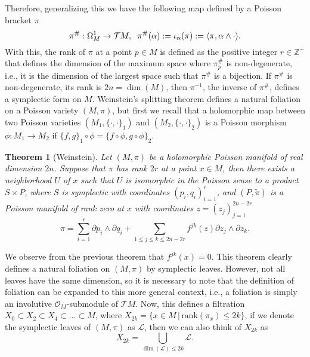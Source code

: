 \documentclass[12pt,twoside,a4paper]{report}
\newtheorem{theorem}{Theorem}[section]
\newcommand{\zah}{\ensuremath{ \mathbb Z }}
\begin{document}
Therefore, generalizing this we have the following map defined by a Poisson bracket $\pi$
\[
        \pi^{\#}:\Omega^1_M\rightarrow\mathcal{T}M,\hspace{0.2cm}\pi^{\#}(\alpha):=\iota_{\alpha}(\pi):=\langle\pi,\alpha\wedge\cdot\rangle.
\]
\noindent With this, the rank of $\pi$ at a point $p\in M$ is defined as the positive integer $r\in \zah^{+}$ that defines the dimension of the
maximum space where $\pi^{\#}_p$ is non-degenerate, i.e., it is the dimension of the largest space such that $\pi^{\#}$ is a
bijection. If $\pi^{\#}$ is non-degenerate, its rank is $2n=\dim(M)$, then $\pi^{-1}$, the inverse of $\pi^{\#}$, defines a symplectic form
on $M$. Weinstein's splitting theorem defines a natural foliation on a Poisson variety $(M,\pi)$, but first
we recall that a holomorphic map between two Poisson varieties $(M_1,\{\cdot,\cdot\}_1)$ and $(M_2,\{\cdot,\cdot\}_2)$ is a Poisson morphism
$\phi:M_1\rightarrow M_2$ if $\{f,g\}_1\circ\phi=\{f\circ\phi,g\circ\phi\}_2$.
\begin{theorem}[Weinstein]\label{weins}
        Let $(M,\pi)$ be a holomorphic Poisson manifold of real dimension $2n$. Suppose that $\pi$ has rank $2r$ at a point $x\in M$,
        then there exists a neighborhood $U$ of $x$ such that $U$ is isomorphic in the Poisson sense to a product $S\times P$, where $S$ is
        symplectic with coordinates $(p_i,q_i)_{i=1}^r$, and $(P,\tilde{\pi})$ is a Poisson manifold of rank zero at $x$
        with coordinates $z=(z_j)_{j=1}^{2n-2r}$
        \[
                \pi=\sum_{i=1}^r \partial{p_i}\wedge\partial{q_i}+\sum_{1\leq j\leq k\leq 2n-2r} f^{jk}(z)\partial{z_j}\wedge\partial{z_k}.
        \]
\end{theorem}
\noindent We observe from the previous theorem that $f^{jk}(x)=0$. This theorem clearly defines a natural foliation on $(M,\pi)$ by
symplectic leaves. However, not all leaves have the same dimension, so it is necessary to note that the definition of foliation
can be expanded to this more general context, i.e., a foliation is simply an involutive $\mathcal{O}_M$-submodule of $\mathcal{T}M$.
Now, this defines a filtration $X_0\subset X_2\subset X_4\subset\dots\subset M$, where $X_{2k}=\{x\in M\,|\,\textrm{rank}(\pi_x)\leq 2k\}$,
if we denote the symplectic leaves of $(M,\pi)$ as $\mathcal{L}$, then we can also think of $X_{2k}$ as
$$
X_{2k}=\bigcup_{\dim(\mathcal{L})\leq 2k}\mathcal{L}.
$$
\end{document}
